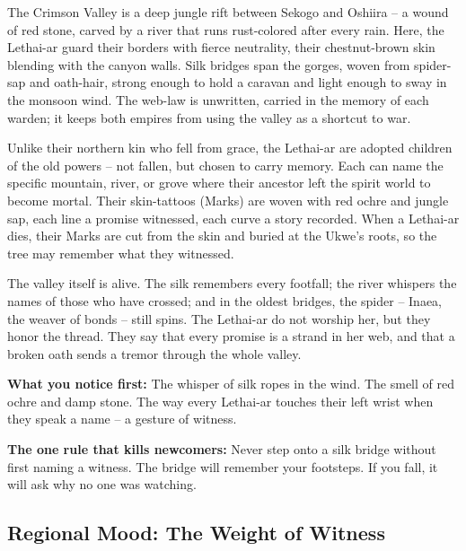 \vspace{2mm}
\begin{tcolorbox}[colback=black!3,colframe=blue!60!black,title={Theme \& Atmosphere},breakable]
The Crimson Valley is a deep jungle rift between Sekogo and Oshiira -- a wound of red stone, carved by a river that runs rust-colored after every rain. Here, the Lethai-ar guard their borders with fierce neutrality, their chestnut-brown skin blending with the canyon walls. Silk bridges span the gorges, woven from spider-sap and oath-hair, strong enough to hold a caravan and light enough to sway in the monsoon wind. The web-law is unwritten, carried in the memory of each warden; it keeps both empires from using the valley as a shortcut to war.

Unlike their northern kin who fell from grace, the Lethai-ar are adopted children of the old powers -- not fallen, but chosen to carry memory. Each can name the specific mountain, river, or grove where their ancestor left the spirit world to become mortal. Their skin-tattoos (Marks) are woven with red ochre and jungle sap, each line a promise witnessed, each curve a story recorded. When a Lethai-ar dies, their Marks are cut from the skin and buried at the Ukwe's roots, so the tree may remember what they witnessed.

The valley itself is alive. The silk remembers every footfall; the river whispers the names of those who have crossed; and in the oldest bridges, the spider -- Inaea, the weaver of bonds -- still spins. The Lethai-ar do not worship her, but they honor the thread. They say that every promise is a strand in her web, and that a broken oath sends a tremor through the whole valley.

\vspace{2mm}
\textbf{What you notice first:} The whisper of silk ropes in the wind. The smell of red ochre and damp stone. The way every Lethai-ar touches their left wrist when they speak a name -- a gesture of witness.

\textbf{The one rule that kills newcomers:} Never step onto a silk bridge without first naming a witness. The bridge will remember your footsteps. If you fall, it will ask why no one was watching.
\end{tcolorbox}

\subsection*{Regional Mood: The Weight of Witness}

